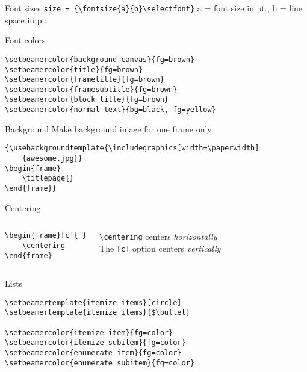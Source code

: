 \documentclass[9pt]{beamer}
\begin{document}
\begin{frame}[fragile=singleslide]{Font sizes}
    \verb|size = {\fontsize{a}{b}\selectfont}|
    a = font size in pt., b = line space in pt.
\end{frame}

\begin{frame}[fragile=singleslide]{Font colors}
\begin{verbatim}
\setbeamercolor{background canvas}{fg=brown}
\setbeamercolor{title}{fg=brown}
\setbeamercolor{frametitle}{fg=brown}
\setbeamercolor{framesubtitle}{fg=brown}
\setbeamercolor{block title}{fg=brown}
\setbeamercolor{normal text}{bg=black, fg=yellow}
\end{verbatim}
\end{frame}

\begin{frame}[fragile=singleslide]{Background}
    Make background image for one frame only
    \begin{verbatim}
{\usebackgroundtemplate{\includegraphics[width=\paperwidth]
    {awesome.jpg}}
\begin{frame}
    \titlepage{}
\end{frame}}
    \end{verbatim}
\end{frame}

\begin{frame}[fragile=singleslide]{Centering}
    \begin{columns}
    \begin{verbatim}
\begin{frame}[c]{ }
    \centering
\end{frame}
    \end{verbatim}
    \verb|\centering| centers \emph{horizontally}\\
    The \verb|[c]| option centers \emph{vertically}
    \end{columns}
\end{frame}

\begin{frame}[fragile=singleslide]{Lists}
\begin{verbatim}
\setbeamertemplate{itemize items}[circle]
\setbeamertemplate{itemize items}{$\bullet}

\setbeamercolor{itemize item}{fg=color}
\setbeamercolor{itemize subitem}{fg=color}
\setbeamercolor{enumerate item}{fg=color}
\setbeamercolor{enumerate subitem}{fg=color}
\end{verbatim}
\end{frame}
\end{document}
